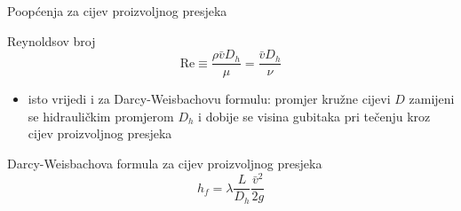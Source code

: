 \documentclass[croatian]{beamer}
\begin{document}
\begin{frame}{Poopćenja za cijev proizvoljnog presjeka}

\begin{block}{Reynoldsov broj}
\[
\mathrm{Re}\equiv\frac{\rho\bar{v}D_{h}}{\mu}=\frac{\bar{v}D_{h}}{\nu}
\]
\end{block}
\begin{itemize}
\item isto vrijedi i za Darcy-Weisbachovu formulu: promjer kružne cijevi
$D$ zamijeni se hidrauličkim promjerom $D_{h}$ i dobije se visina
gubitaka pri tečenju kroz cijev proizvoljnog presjeka
\end{itemize}
\begin{block}{Darcy-Weisbachova formula za cijev proizvoljnog presjeka}
\[
h_{f}=\lambda\frac{L}{D_{h}}\frac{\bar{v}^{2}}{2g}
\]
\end{block}
\end{frame}
\end{document}
